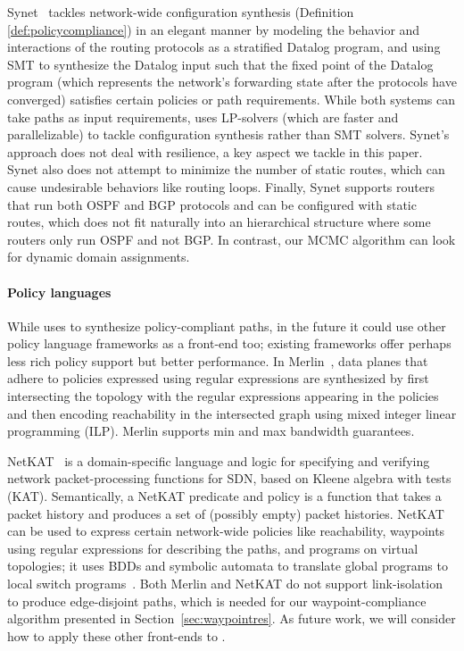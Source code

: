 Synet~\cite{synet} tackles network-wide configuration
synthesis (Definition \ref{def:policycompliance}) in an elegant manner by
modeling the behavior and interactions of the routing protocols as a
stratified Datalog program, and using SMT to synthesize the Datalog
input such that the fixed point of the Datalog program (which
represents the network's forwarding state after the protocols have
converged) satisfies certain policies or path requirements. 
While both systems can take paths as input requirements,  
\name uses LP-solvers (which are faster and parallelizable) 
to tackle configuration
synthesis rather than SMT solvers.
Synet's approach does not deal with resilience, 
a key aspect we tackle 
in this paper.  Synet also does not attempt to 
minimize the number of static routes, which can cause
undesirable behaviors like routing loops.
Finally, Synet supports routers that run both
OSPF and BGP protocols and can be configured with 
static routes, which does not fit naturally into an hierarchical structure
where some routers only run OSPF and not BGP. In contrast, our MCMC algorithm can
look for dynamic domain assignments.
%

\paragraph{Policy languages} While \name uses \genesis 
to synthesize policy-compliant paths, in the future it could use
other policy language frameworks as a front-end
too; existing frameworks offer perhaps less rich policy support but better
performance. %
In Merlin~\cite{merlin}, data planes that adhere to policies expressed
using regular expressions are synthesized by first intersecting the
topology with the regular expressions appearing in the policies and
then encoding reachability in the intersected graph using mixed
integer linear programming (ILP).  Merlin supports min and max
bandwidth guarantees.

NetKAT~\cite{netkat} is a domain-specific language and logic for 
specifying and verifying network packet-processing functions
for SDN, based on Kleene algebra with tests (KAT). Semantically,
a NetKAT predicate and policy is a function that takes a packet
history and produces a set of (possibly empty) packet histories. 
NetKAT can be used to express certain network-wide policies like 
reachability, waypoints using regular expressions for describing the paths, 
and programs on virtual topologies; it uses
BDDs and symbolic automata to translate global programs to local
switch programs~\cite{netkatcompiler}.
Both Merlin and NetKAT  do not support link-isolation 
to produce edge-disjoint paths, which is needed for  
our waypoint-compliance algorithm presented in Section~\ref{sec:waypointres}.
As future work, we will consider 
how to apply these other front-ends to \name.

